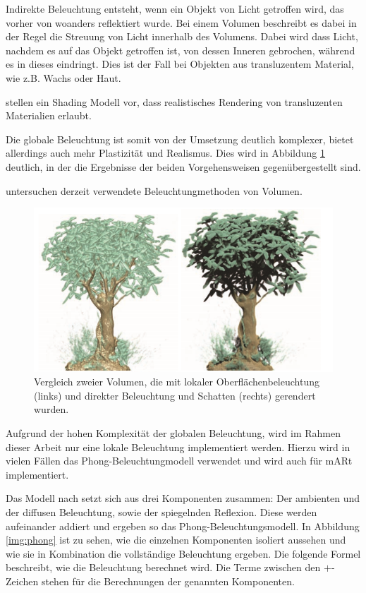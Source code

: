 Indirekte Beleuchtung entsteht, wenn ein Objekt von Licht getroffen wird, das vorher von woanders reflektiert wurde. Bei einem Volumen beschreibt es dabei in der Regel die Streuung von Licht innerhalb des Volumens. Dabei wird dass Licht, nachdem es auf das Objekt getroffen ist, von dessen Inneren gebrochen, während es in dieses eindringt. Dies ist der Fall bei Objekten aus transluzentem Material, wie z.B. Wachs oder Haut.

\cite{hansen02} stellen ein Shading Modell vor, dass realistisches Rendering von transluzenten Materialien erlaubt.


Die globale Beleuchtung ist somit von der Umsetzung deutlich komplexer, bietet allerdings auch mehr Plastizität und Realismus. Dies wird in Abbildung \ref{img:localGlobalIll} deutlich, in der die Ergebnisse der beiden Vorgehensweisen gegenübergestellt sind.

\cite{Jnsson14} untersuchen derzeit verwendete Beleuchtungmethoden von Volumen.

\begin{figure}[!htb]
	\centering
	\includegraphics[width=0.7\linewidth]{images/localGlobalIllumination.png}
	\caption{Vergleich zweier Volumen, die mit lokaler Oberflächenbeleuchtung (links) und direkter Beleuchtung und Schatten (rechts) gerendert wurden.}
	\label{img:localGlobalIll}
\end{figure}
\FloatBarrier

Aufgrund der hohen Komplexität der globalen Beleuchtung, wird im Rahmen dieser Arbeit nur eine lokale Beleuchtung implementiert werden. 
Hierzu wird in vielen Fällen das Phong-Beleuchtungmodell verwendet und wird auch für mARt implementiert.

Das Modell nach \cite{phong75} setzt sich aus drei Komponenten zusammen: Der ambienten und der diffusen Beleuchtung, sowie der spiegelnden Reflexion. Diese werden aufeinander addiert und ergeben so das Phong-Beleuchtungsmodell.  In Abbildung \ref{img:phong} ist zu sehen, wie die einzelnen Komponenten isoliert aussehen und wie sie in Kombination die vollständige Beleuchtung ergeben.
Die folgende Formel beschreibt, wie die Beleuchtung berechnet wird. Die Terme zwischen den $+$-Zeichen stehen für die Berechnungen der genannten Komponenten.

